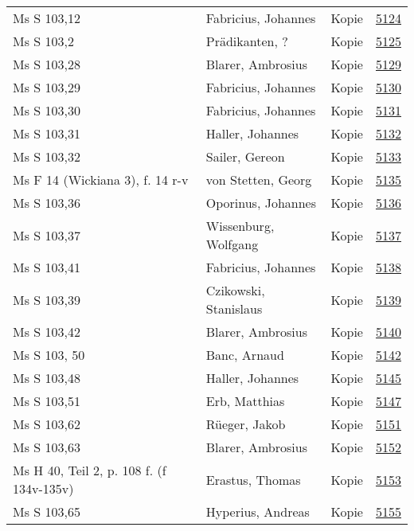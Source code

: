 \documentclass[10pt,a4paper,landscape]{report}
\begin{document}
\begin{longtable}{p{16cm}p{4cm}lr}
Ms S 103,12	&	Fabricius, Johannes	&	Kopie	&	\href{http://130.60.24.72/assignment/5124}{5124}\\
Ms S 103,2	&	Prädikanten, ?	&	Kopie	&	\href{http://130.60.24.72/assignment/5125}{5125}\\
Ms S 103,28	&	Blarer, Ambrosius	&	Kopie	&	\href{http://130.60.24.72/assignment/5129}{5129}\\
Ms S 103,29	&	Fabricius, Johannes	&	Kopie	&	\href{http://130.60.24.72/assignment/5130}{5130}\\
Ms S 103,30	&	Fabricius, Johannes	&	Kopie	&	\href{http://130.60.24.72/assignment/5131}{5131}\\
Ms S 103,31	&	Haller, Johannes	&	Kopie	&	\href{http://130.60.24.72/assignment/5132}{5132}\\
Ms S 103,32	&	Sailer, Gereon	&	Kopie	&	\href{http://130.60.24.72/assignment/5133}{5133}\\
Ms F 14 (Wickiana 3), f. 14 r-v	&	von Stetten, Georg	&	Kopie	&	\href{http://130.60.24.72/assignment/5135}{5135}\\
Ms S 103,36	&	Oporinus, Johannes	&	Kopie	&	\href{http://130.60.24.72/assignment/5136}{5136}\\
Ms S 103,37	&	Wissenburg, Wolfgang	&	Kopie	&	\href{http://130.60.24.72/assignment/5137}{5137}\\
Ms S 103,41	&	Fabricius, Johannes	&	Kopie	&	\href{http://130.60.24.72/assignment/5138}{5138}\\
Ms S 103,39	&	Czikowski, Stanislaus	&	Kopie	&	\href{http://130.60.24.72/assignment/5139}{5139}\\
Ms S 103,42	&	Blarer, Ambrosius	&	Kopie	&	\href{http://130.60.24.72/assignment/5140}{5140}\\
Ms S 103, 50	&	Banc, Arnaud	&	Kopie	&	\href{http://130.60.24.72/assignment/5142}{5142}\\
Ms S 103,48	&	Haller, Johannes	&	Kopie	&	\href{http://130.60.24.72/assignment/5145}{5145}\\
Ms S 103,51	&	Erb, Matthias	&	Kopie	&	\href{http://130.60.24.72/assignment/5147}{5147}\\
Ms S 103,62	&	Rüeger, Jakob	&	Kopie	&	\href{http://130.60.24.72/assignment/5151}{5151}\\
Ms S 103,63	&	Blarer, Ambrosius	&	Kopie	&	\href{http://130.60.24.72/assignment/5152}{5152}\\
Ms H 40, Teil 2, p. 108 f. (f 134v-135v)	&	Erastus, Thomas	&	Kopie	&	\href{http://130.60.24.72/assignment/5153}{5153}\\
Ms S 103,65	&	Hyperius, Andreas	&	Kopie	&	\href{http://130.60.24.72/assignment/5155}{5155}\\

\end{longtable}
\end{document}
